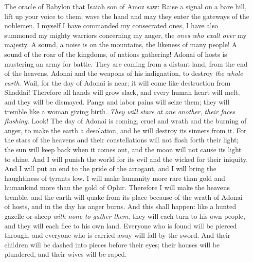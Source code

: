 \begin{biblechapter} %
 The oracle of Babylon that Isaiah son of Amoz saw:
\verse Raise a signal on a bare hill, 
lift up your voice to them; 
wave the hand and may they enter the gateways of the noblemen.
\verse I myself I have commanded my consecrated ones, 
I have also summoned my mighty warriors concerning my anger, 
the \textit{ones who exalt over} my majesty.
\verse A sound, a noise is on the mountains, 
the likeness of many people! 
A sound of the roar of the kingdoms, 
of nations gathering! 
Adonai of hosts is mustering an army for battle.
\verse They are coming from a distant land, 
from the end of the heavens, 
Adonai and the weapons of his indignation, 
to destroy \textit{the whole earth}.
\verse Wail, for the day of Adonai is near; 
it will come like destruction from Shaddai!
\verse Therefore all hands will grow slack, 
and every human heart will melt,
\verse and they will be dismayed. 
Pangs and labor pains will seize them; 
they will tremble like a woman giving birth. 
\textit{They will stare at one another}, 
\textit{their faces flushing}.
\verse Look! The day of Adonai is coming, 
cruel and wrath and the burning of anger, 
to make the earth a desolation, 
and he will destroy its sinners from it.
\verse For the stars of the heavens and their constellations will not flash forth their light; 
the sun will keep back when it comes out, 
and the moon will not cause its light to shine.
\verse And I will punish the world for its evil 
and the wicked for their iniquity. 
And I will put an end to the pride of the arrogant, 
and I will bring the haughtiness of tyrants low.
\verse I will make humanity more rare than gold 
and humankind more than the gold of Ophir.
\verse Therefore I will make the heavens tremble, 
and the earth will quake from its place 
because of the wrath of Adonai of hosts, 
and in the day his anger burns.
\verse And this shall happen:
\verse like a hunted gazelle or sheep \textit{with none to gather them}, 
they will each turn to his own people, 
and they will each flee to his own land.
\verse Everyone who is found will be pierced through, 
and everyone who is carried away will fall by the sword.
\verse And their children will be dashed into pieces before their eyes; 
their houses will be plundered, and their wives will be raped.

\end{biblechapter}
